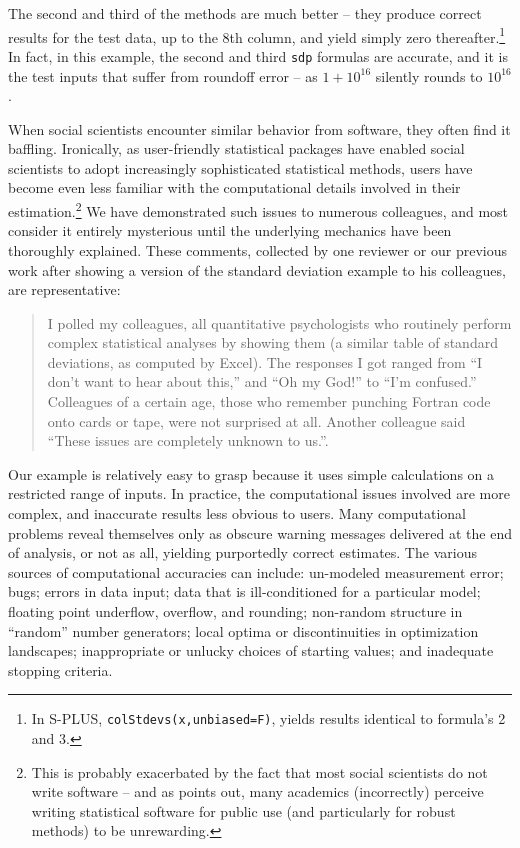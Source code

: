\documentclass[11pt]{article}
\let\code=\texttt
\let\proglang=\textsf
\begin{document}
The second and third of the methods are much better -- they produce correct results for the test 
data, up to the 8th column, and yield simply zero 
	thereafter.\footnote{In \proglang{S-PLUS}, \code{colStdevs(x,unbiased=F)}, yields results 
	identical to formula's 2 and 3.} In fact, in this example, the second and third \code{sdp} 
	formulas are accurate, and it is the test inputs that suffer from roundoff error -- as 
	$1 + 10^{16}$ silently rounds to $10^{16}$.
 
When social scientists encounter similar behavior from software, they often find it baffling. Ironically, 
as user-friendly statistical packages have enabled social scientists to adopt increasingly sophisticated 
statistical methods, users have become even less familiar with the computational details involved in their 
	estimation.\footnote{This is probably exacerbated by the fact that most social scientists do not 
	write software -- and as \citep{Stromberg04} points out, many academics (incorrectly) perceive writing 
	statistical software for public use (and particularly for robust methods) to be unrewarding.} 
We have demonstrated such issues to numerous colleagues, and most consider it entirely mysterious until the 
underlying mechanics have been thoroughly explained. These comments, collected by one reviewer or our 
previous work \citep{VanZandt05} after showing a version of the standard deviation example 
to his colleagues, are representative: 
\begin{quote}
	I polled my colleagues, all quantitative psychologists who routinely perform complex 
	statistical analyses by showing them (a similar table of standard deviations, as computed 
	by \proglang{Excel}). The responses I got ranged from ``I don't want to hear about this,'' 
	and ``Oh my God!'' to ``I'm confused.'' Colleagues of a certain age, those who remember 
	punching Fortran code onto cards or tape, were not surprised at all. Another colleague 
	said ``These issues are completely unknown to us.''.
\end{quote}
Our example is relatively easy to grasp because it uses simple calculations on a restricted range of inputs. 
In practice, the computational issues involved are more complex, and inaccurate results less obvious to users. 
Many computational problems reveal themselves only as obscure warning messages delivered at the end of 
analysis, or not as all, yielding purportedly correct estimates. The various sources of computational 
accuracies can include: un-modeled measurement error; bugs; errors in data input; data that is ill-conditioned 
for a particular model; floating point underflow, overflow, and rounding; non-random structure in ``random'' 
number generators; local optima or discontinuities in optimization landscapes; inappropriate or unlucky 
choices of starting values; and inadequate stopping criteria. 
\end{document}
